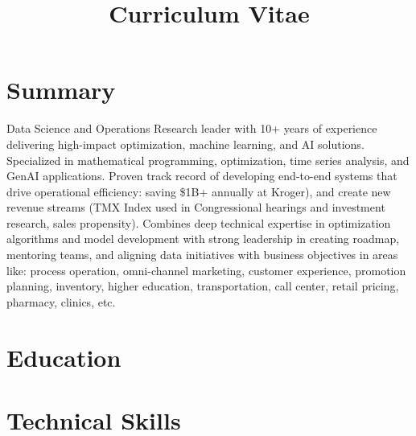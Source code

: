 \documentclass[12pt,a4paper,sans]{moderncv}
\title{Curriculum Vitae}
\begin{document}
\setlength{\parskip}{1em}
\makecvtitle

\section{Summary}
Data Science and Operations Research leader with 10+ years of experience delivering high-impact optimization, machine learning, and AI solutions. Specialized in mathematical programming, optimization, time series analysis, and GenAI applications. Proven track record of developing end-to-end systems that drive operational efficiency: saving \$1B+ annually at Kroger), and create new revenue streams (TMX Index used in Congressional hearings and investment research, sales propensity). Combines deep technical expertise in optimization algorithms and model development with strong leadership in creating roadmap, mentoring teams, and aligning data initiatives with business objectives in areas like: process operation, omni-channel marketing, customer experience, promotion planning, inventory, higher education, transportation, call center, retail pricing, pharmacy, clinics, etc.  
\section{Education}

\section{Technical Skills}
\end{document}
